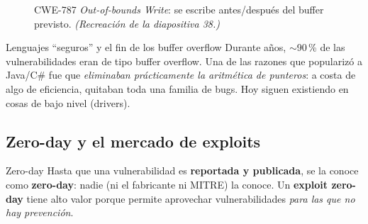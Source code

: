 \documentclass[11pt,a4paper]{article}
\begin{document}
\begin{figure}[h]
\centering
{}
\caption{CWE-787 \emph{Out-of-bounds Write}: se escribe antes/después del buffer previsto.
\textit{(Recreación de la diapositiva 38.)}}
\end{figure}

\begin{practbox}{Lenguajes ``seguros'' y el fin de los buffer overflow}
Durante años, $\sim$90\,\% de las vulnerabilidades eran de tipo buffer overflow. Una de las
razones que popularizó a Java/C\# fue que \emph{eliminaban prácticamente la aritmética de
punteros}: a costa de algo de eficiencia, quitaban toda una familia de bugs. Hoy siguen
existiendo en cosas de bajo nivel (drivers).
\end{practbox}

\subsection{Zero-day y el mercado de exploits}

\begin{defbox}{Zero-day}
Hasta que una vulnerabilidad es \textbf{reportada y publicada}, se la conoce como
\textbf{zero-day}: nadie (ni el fabricante ni MITRE) la conoce. Un \textbf{exploit zero-day}
tiene alto valor porque permite aprovechar vulnerabilidades \emph{para las que no hay
prevención}.
\end{defbox}
\end{document}
